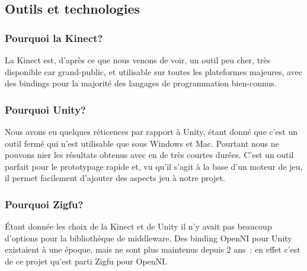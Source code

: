 \subsection{Outils et technologies} 
\subsubsection{Pourquoi la Kinect?}
La Kinect est, d'après ce que nous venons de voir, un outil peu cher, 
très disponible car grand-public, et utilisable sur toutes les plateformes
majeures, avec des bindings pour la majorité des langages de programmation 
bien-connus.

\subsubsection{Pourquoi Unity?}
Nous avons eu quelques réticences par rapport à Unity, étant donné que c'est 
un outil fermé qui n'est utilisable que sous Windows et Mac. Pourtant nous ne 
pouvons nier les résultats obtenus avec en de très courtes durées. C'est
un outil parfait pour le prototypage rapide et, vu qu'il s'agit à la base d'un
moteur de jeu, il permet facilement d'ajouter des aspects jeu à notre projet.

\subsubsection{Pourquoi Zigfu?}
Étant donnée les choix de la Kinect et de Unity il n'y avait pas beaucoup d'options
pour la bibliothèque de middleware. Des binding OpenNI pour Unity existaient
à une époque, mais ne sont plus maintenus depuis 2 ans~: en effet c'est de ce
projet qu'est parti Zigfu pour OpenNI\cite{zigfu_branch}.
